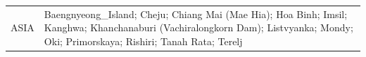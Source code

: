 \documentclass[journal abbreviation, manuscript]{copernicus}
\begin{document}
\begin{table}
\begin{tabularx}{\textwidth}{lX}
  ASIA     & Baengnyeong\_Island; Cheju; Chiang Mai (Mae Hia); Hoa Binh; Imsil; Kanghwa; Khanchanaburi (Vachiralongkorn Dam); Listvyanka; Mondy; Oki; Primorskaya; Rishiri; Tanah Rata; Terelj                                                                                                                                                                                                                                                                                                                                                                                                                                                                                                                                                                                                                                                                                                                                                                                                                                                                                                                                                                                                                                                                                                                                                                                                                                                                                                                                                                                                                                                                                                                                                                                                                                                                                                                                                                                                                                                                                                                                                                                                                                                                                                                                                                                                                                                                                                                                                                                                                                                                                                                                                                                                                                                                                                                                                                                                                                                                                                                                                                                                                                                                                                                                                                                                                           
\end{tabularx}
\end{table}
\end{document}
